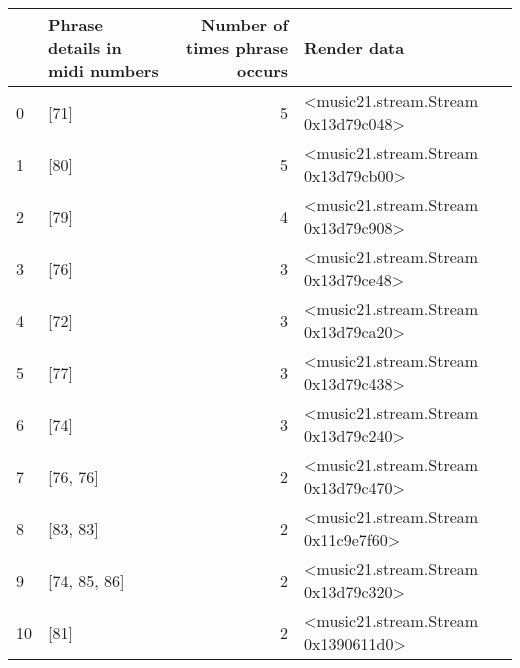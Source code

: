 \documentclass[11pt]{article}
\begin{document}
    \begin{tabular}{llrl}
\toprule
{} & Phrase details in midi numbers &  Number of times phrase occurs &                          Render data \\
\midrule
0  &  [71] &  5 &  <music21.stream.Stream 0x13d79c048> \\
1  &  [80] &  5 &  <music21.stream.Stream 0x13d79cb00> \\
2  &  [79] &  4 &  <music21.stream.Stream 0x13d79c908> \\
3  &  [76] &  3 &  <music21.stream.Stream 0x13d79ce48> \\
4  &  [72] &  3 &  <music21.stream.Stream 0x13d79ca20> \\
5  &  [77] &  3 &  <music21.stream.Stream 0x13d79c438> \\
6  &  [74] &  3 &  <music21.stream.Stream 0x13d79c240> \\
7  &  [76, 76] &  2 &  <music21.stream.Stream 0x13d79c470> \\
8  &  [83, 83] &  2 &  <music21.stream.Stream 0x11c9e7f60> \\
9  &  [74, 85, 86] &  2 &  <music21.stream.Stream 0x13d79c320> \\
10 &  [81] &  2 &  <music21.stream.Stream 0x1390611d0> \\
\bottomrule
\end{tabular}

    
\end{document}
